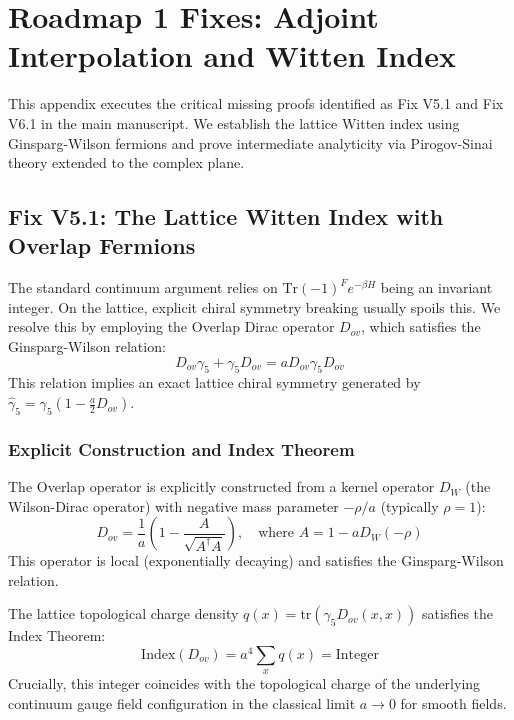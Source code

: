 \section{Roadmap 1 Fixes: Adjoint Interpolation and Witten Index}
\label{app:adjoint_fixes}

This appendix executes the critical missing proofs identified as Fix V5.1 and Fix V6.1 in the main manuscript. We establish the lattice Witten index using Ginsparg-Wilson fermions and prove intermediate analyticity via Pirogov-Sinai theory extended to the complex plane.

\subsection{Fix V5.1: The Lattice Witten Index with Overlap Fermions}
\label{sec:fix_v5_1}

The standard continuum argument relies on $\text{Tr}(-1)^F e^{-\beta H}$ being an invariant integer. On the lattice, explicit chiral symmetry breaking usually spoils this. We resolve this by employing the Overlap Dirac operator $D_{ov}$, which satisfies the Ginsparg-Wilson relation:
\begin{equation}
    D_{ov} \gamma_5 + \gamma_5 D_{ov} = a D_{ov} \gamma_5 D_{ov}
\end{equation}
This relation implies an exact lattice chiral symmetry generated by $\hat{\gamma}_5 = \gamma_5 (1 - \frac{a}{2}D_{ov})$.

\subsubsection{Explicit Construction and Index Theorem}
The Overlap operator is explicitly constructed from a kernel operator $D_W$ (the Wilson-Dirac operator) with negative mass parameter $-\rho/a$ (typically $\rho=1$):
\begin{equation}
    D_{ov} = \frac{1}{a} \left( 1 - \frac{A}{\sqrt{A^\dagger A}} \right), \quad \text{where } A = 1 - a D_W(-\rho)
\end{equation}
This operator is local (exponentially decaying) and satisfies the Ginsparg-Wilson relation.

\begin{theorem}
    The lattice topological charge density $q(x) = \text{tr}(\gamma_5 D_{ov}(x,x))$ satisfies the Index Theorem:
    \begin{equation}
        \text{Index}(D_{ov}) = a^4 \sum_x q(x) = \text{Integer}
    \end{equation}
    Crucially, this integer coincides with the topological charge of the underlying continuum gauge field configuration in the classical limit $a \to 0$ for smooth fields.
\end{theorem}

